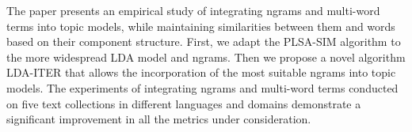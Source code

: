 The paper presents an empirical study of integrating ngrams and multi-word terms into topic models, while maintaining similarities between them and words based on their component structure. First, we adapt the PLSA-SIM algorithm to the more widespread LDA model and ngrams. Then we propose a novel algorithm LDA-ITER that allows the incorporation of the most suitable ngrams into topic models. The experiments of integrating ngrams and multi-word terms conducted on five text collections in different languages and domains demonstrate a significant improvement in all the metrics under consideration.
